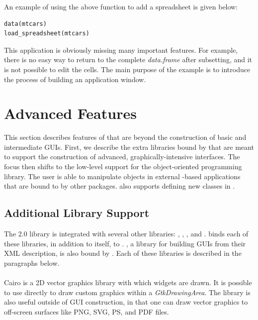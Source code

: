 \documentclass[article]{jss}
\begin{document}
An example of using the above function to add a spreadsheet is given below:
\begin{verbatim}
data(mtcars)
load_spreadsheet(mtcars)
\end{verbatim}

This application is obviously missing many important features. For example, 
there is no easy way to return to the complete \emph{data.frame} after subsetting, and
it is not possible to edit the cells. The main purpose of the example is to
introduce the process of building an application window.

\section{Advanced Features}

This section describes features of  that are beyond the construction
of basic and intermediate GUIs. First, we describe the extra libraries bound
by  that are meant to support the construction of advanced,
graphically-intensive interfaces. The focus then shifts to the low-level support 
for the  object-oriented programming library. The 
user is able to manipulate
objects in external -based applications that are bound to 
by other packages.  also supports defining new  classes 
in .

\subsection{Additional Library Support}

The  2.0 library is integrated with several other libraries: , 
, ,  and . 
 binds each of these libraries, in addition to  itself, to .
, a library for building GUIs from their XML description, is
also bound by . Each of these libraries is described in the paragraphs below. 

\paragraph[Cairo]{} 

Cairo is a 2D vector graphics library with 
which  widgets are drawn. It is possible to use  directly 
to draw custom graphics within a \emph{GtkDrawingArea}. The library is also 
useful outside of GUI construction, in that one can draw vector graphics to 
off-screen surfaces like PNG, SVG, PS, and PDF files. 
\end{document}
